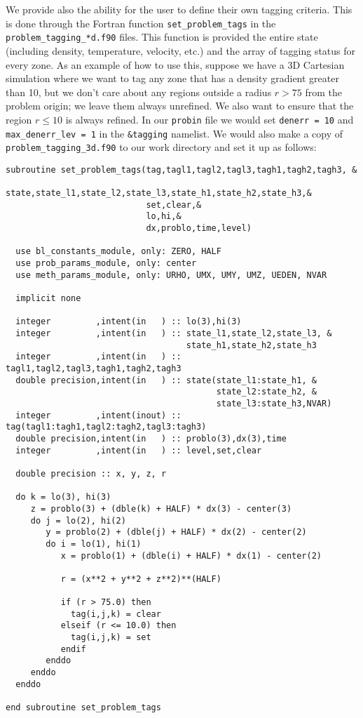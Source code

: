 We provide also the ability for the user to define their own tagging criteria.
This is done through the Fortran function {\tt set\_problem\_tags} in the 
{\tt problem\_tagging\_*d.f90} files. This function is provided the entire 
state (including density, temperature, velocity, etc.) and the array 
of tagging status for every zone. As an example of how to use this, suppose we 
have a 3D Cartesian simulation where we want to tag any zone that has a 
density gradient greater than 10, but we don't care about any regions 
outside a radius $r > 75$ from the problem origin; we leave them always unrefined. 
We also want to ensure that the region $r \leq 10$ is always refined.
In our {\tt probin} file we would set {\tt denerr = 10} and {\tt max\_denerr\_lev = 1}
in the {\tt \&tagging} namelist. We would also make a copy of 
{\tt problem\_tagging\_3d.f90} to our work directory and set it up as follows:
\clearpage
\begin{verbatim}
subroutine set_problem_tags(tag,tagl1,tagl2,tagl3,tagh1,tagh2,tagh3, &
                            state,state_l1,state_l2,state_l3,state_h1,state_h2,state_h3,&
                            set,clear,&
                            lo,hi,&
                            dx,problo,time,level)

  use bl_constants_module, only: ZERO, HALF
  use prob_params_module, only: center
  use meth_params_module, only: URHO, UMX, UMY, UMZ, UEDEN, NVAR
 
  implicit none
  
  integer         ,intent(in   ) :: lo(3),hi(3)
  integer         ,intent(in   ) :: state_l1,state_l2,state_l3, &
                                    state_h1,state_h2,state_h3
  integer         ,intent(in   ) :: tagl1,tagl2,tagl3,tagh1,tagh2,tagh3
  double precision,intent(in   ) :: state(state_l1:state_h1, &
                                          state_l2:state_h2, &
                                          state_l3:state_h3,NVAR)
  integer         ,intent(inout) :: tag(tagl1:tagh1,tagl2:tagh2,tagl3:tagh3)
  double precision,intent(in   ) :: problo(3),dx(3),time
  integer         ,intent(in   ) :: level,set,clear

  double precision :: x, y, z, r

  do k = lo(3), hi(3)
     z = problo(3) + (dble(k) + HALF) * dx(3) - center(3)
     do j = lo(2), hi(2)
        y = problo(2) + (dble(j) + HALF) * dx(2) - center(2)
        do i = lo(1), hi(1)
           x = problo(1) + (dble(i) + HALF) * dx(1) - center(2)

           r = (x**2 + y**2 + z**2)**(HALF)

           if (r > 75.0) then
             tag(i,j,k) = clear
           elseif (r <= 10.0) then
             tag(i,j,k) = set
           endif
        enddo
     enddo
  enddo
  
end subroutine set_problem_tags
\end{verbatim}

